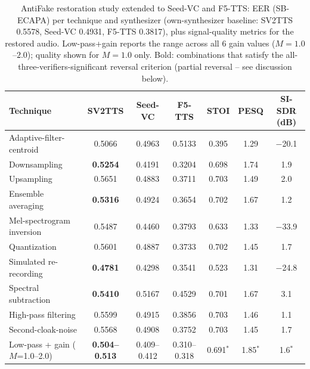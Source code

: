 \documentclass[11pt]{article}
\begin{document}
\begin{table}[H]
\centering
\caption{AntiFake restoration study extended to Seed-VC and F5-TTS: EER
(SB-ECAPA) per technique and synthesizer (own-synthesizer baseline:
SV2TTS 0.5578, Seed-VC 0.4931, F5-TTS 0.3817), plus signal-quality
metrics for the restored audio. Low-pass+gain reports the range across
all 6 gain values ($M=1.0$--$2.0$); quality shown for $M=1.0$ only.
Bold: combinations that satisfy the all-three-verifiers-significant
reversal criterion (partial reversal -- see discussion below).}
\label{tab:restoration-antifake-seedvc-f5tts}
\begin{tabular}{lcccccc}
\toprule
Technique & SV2TTS & Seed-VC & F5-TTS & STOI & PESQ & SI-SDR (dB) \\
\midrule
Adaptive-filter-centroid  & 0.5066 & 0.4963 & 0.5133 & 0.395 & 1.29 & $-$20.1 \\
Downsampling              & \textbf{0.5254} & 0.4191 & 0.3204 & 0.698 & 1.74 & 1.9 \\
Upsampling                & 0.5651 & 0.4883 & 0.3711 & 0.703 & 1.49 & 2.0 \\
Ensemble averaging        & \textbf{0.5316} & 0.4924 & 0.3654 & 0.702 & 1.67 & 1.2 \\
Mel-spectrogram inversion & 0.5487 & 0.4460 & 0.3793 & 0.633 & 1.33 & $-$33.9 \\
Quantization              & 0.5601 & 0.4887 & 0.3733 & 0.702 & 1.45 & 1.7 \\
Simulated re-recording    & \textbf{0.4781} & 0.4298 & 0.3541 & 0.523 & 1.31 & $-$24.8 \\
Spectral subtraction      & \textbf{0.5410} & 0.5167 & 0.4529 & 0.701 & 1.67 & 3.1 \\
High-pass filtering       & 0.5599 & 0.4915 & 0.3856 & 0.703 & 1.46 & 1.1 \\
Second-cloak-noise        & 0.5568 & 0.4908 & 0.3752 & 0.703 & 1.45 & 1.7 \\
Low-pass + gain ($M$=1.0--2.0) & \textbf{0.504--0.513} & 0.409--0.412 & 0.310--0.318 & 0.691$^{\ast}$ & 1.85$^{\ast}$ & 1.6$^{\ast}$ \\
\bottomrule
\end{tabular}
\end{table}
\end{document}
